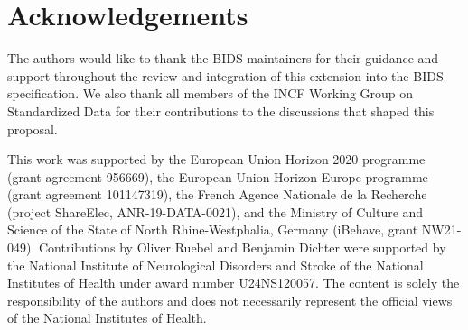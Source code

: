 \documentclass[fleqn,10pt]{article}
\begin{document}




\section*{Acknowledgements}

The authors would like to thank the BIDS maintainers for their guidance and support throughout the review and integration of this extension into the BIDS specification.
We also thank all members of the INCF Working Group on Standardized Data for their contributions to the discussions that shaped this proposal.

This work was supported by
the European Union Horizon 2020 programme (grant agreement 956669),
the European Union Horizon Europe programme (grant agreement 101147319),
the French Agence Nationale de la Recherche (project ShareElec, ANR-19-DATA-0021),
and the Ministry of Culture and Science of the State of North Rhine-Westphalia, Germany (iBehave, grant NW21-049).
Contributions by Oliver Ruebel and Benjamin Dichter were supported by the National Institute of Neurological Disorders and Stroke of the National Institutes of Health under award number U24NS120057.
The content is solely the responsibility of the authors and does not necessarily represent the official views of the National Institutes of Health.
\end{document}
